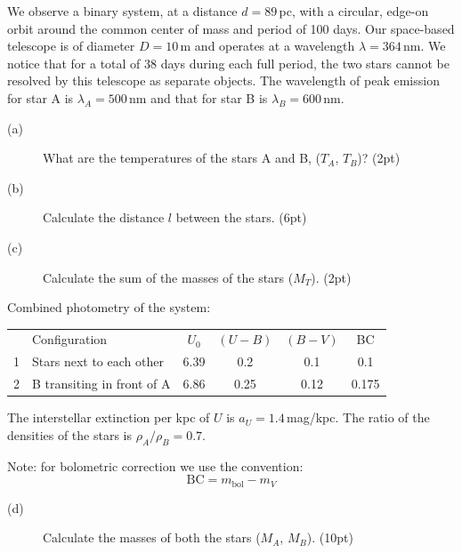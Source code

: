 We observe a binary system, at a distance $d = 89$\,pc, with a circular,
edge-on orbit around the common center of mass and period of 100 days. Our
space-based telescope is of diameter $D = 10$\,m and operates at a wavelength
$\lambda = 364$\,nm. We notice that for a total of 38 days during each full
period, the two stars cannot be resolved by this telescope as separate
objects. The wavelength of peak emission for star A is
$\lambda_A = 500$\,nm and that for star B is $\lambda_B = 600$\,nm.

\begin{description}
\item[(a)] What are the temperatures of the stars A and B, ($T_A$, $T_B$)?
  \hfill(2pt)
\item[(b)] Calculate the distance $l$ between the stars. \hfill(6pt)
\item[(c)] Calculate the sum of the masses of the stars ($M_T$). \hfill(2pt)
\end{description}

Combined photometry of the system:

\begin{center}
\begin{tabular}{clcccc}
 & Configuration & $U_0$ & $(U-B)$ & $(B-V)$ & BC \\
1 & Stars next to each other & 6.39 & 0.2 & 0.1 & 0.1 \\
2 & B transiting in front of A & 6.86 & 0.25 & 0.12 & 0.175 \\
\end{tabular}
\end{center}

The interstellar extinction per kpc of $U$ is $a_U = 1.4$\,mag/kpc. The
ratio of the densities of the stars is $\rho_A/\rho_B = 0.7$.

Note: for bolometric correction we use the convention:
\[ \mathrm{BC} = m_{\mathrm{bol}} - m_V \]

\begin{description}
\item[(d)] Calculate the masses of both the stars ($M_A$, $M_B$).
  \hfill(10pt)
\end{description}

